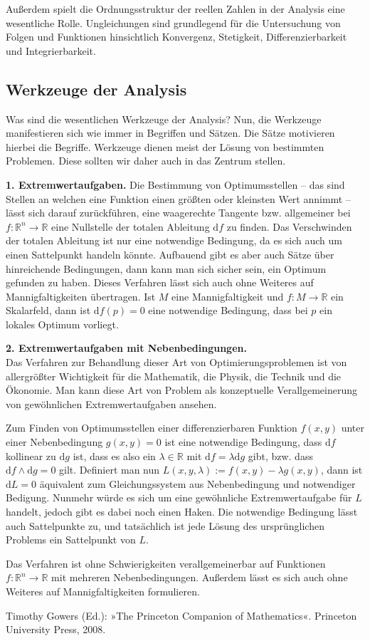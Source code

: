 \documentclass[a4paper,10pt,fleqn,twocolumn,twoside]{scrartcl}
\newcommand{\R}{\mathbb R}
\newcommand{\strong}[1]{\textsf{\textbf{#1}}}
\begin{document}
Außerdem spielt die Ordnungsstruktur der reellen Zahlen in der
Analysis eine wesentliche Rolle. Ungleichungen sind grundlegend
für die Untersuchung von Folgen und Funktionen hinsichtlich
Konvergenz, Stetigkeit, Differenzierbarkeit und Integrierbarkeit.

\subsection{Werkzeuge der Analysis}

Was sind die wesentlichen Werkzeuge der Analysis? Nun, die Werkzeuge
manifestieren sich wie immer in Begriffen und Sätzen. Die Sätze
motivieren hierbei die Begriffe. Werkzeuge dienen meist der Lösung
von bestimmten Problemen. Diese sollten wir daher auch in das Zentrum
stellen.

\strong{1. Extremwertaufgaben.} Die Bestimmung von Optimumsstellen
-- das sind Stellen an welchen eine Funktion einen größten oder
kleinsten Wert annimmt -- lässt sich darauf zurückführen, eine
waagerechte Tangente bzw. allgemeiner bei $f\colon\R^n\to\R$ eine
Nullstelle der totalen Ableitung $\mathrm df$ zu finden. Das
Verschwinden der totalen Ableitung ist nur eine notwendige Bedingung,
da es sich auch um einen Sattelpunkt handeln könnte. Aufbauend
gibt es aber auch Sätze über hinreichende Bedingungen, dann kann man
sich sicher sein, ein Optimum gefunden zu haben. Dieses Verfahren
lässt sich auch ohne Weiteres auf Mannigfaltigkeiten übertragen.
Ist $M$ eine Mannigfaltigkeit und $f\colon M\to\R$ ein Skalarfeld,
dann ist $\mathrm df(p)=0$ eine notwendige Bedingung, dass bei $p$
ein lokales Optimum vorliegt.

\strong{2. Extremwertaufgaben mit Nebenbedingungen.}\\
Das Verfahren zur Behandlung dieser Art von Optimierungsproblemen
ist von allergrößter Wichtigkeit für die Mathematik, die Physik,
die Technik und die Ökonomie. Man kann diese Art von Problem als
konzeptuelle Verallgemeinerung von gewöhnlichen Extremwertaufgaben
ansehen.

Zum Finden von Optimumsstellen einer differenzierbaren Funktion
$f(x,y)$ unter einer Nebenbedingung $g(x,y)=0$ ist eine notwendige
Bedingung, dass $\mathrm df$ kollinear zu $\mathrm dg$ ist, dass
es also ein $\lambda\in\R$ mit $\mathrm df = \lambda\mathrm dg$
gibt, bzw. dass $\mathrm df\wedge\mathrm dg=0$ gilt. Definiert
man nun $L(x,y,\lambda):=f(x,y)-\lambda g(x,y)$, dann ist
$\mathrm dL=0$ äquivalent zum Gleichungssystem aus Nebenbedingung
und notwendiger Bedigung. Nunmehr würde es sich um eine
gewöhnliche Extremwertaufgabe für $L$ handelt, jedoch gibt
es dabei noch einen Haken. Die notwendige Bedingung lässt auch
Sattelpunkte zu, und tatsächlich ist jede Lösung des ursprünglichen
Problems ein Sattelpunkt von $L$.

Das Verfahren ist ohne Schwierigkeiten verallgemeinerbar auf
Funktionen $f\colon\R^n\to\R$ mit mehreren Nebenbedingungen.
Außerdem lässt es sich auch ohne Weiteres auf Mannigfaltigkeiten
formulieren.

\begin{thebibliography}{0}
 Timothy Gowers (Ed.):
»The Princeton Companion of Mathematics«. Princeton University Press,
2008.
\end{thebibliography}
\end{document}

